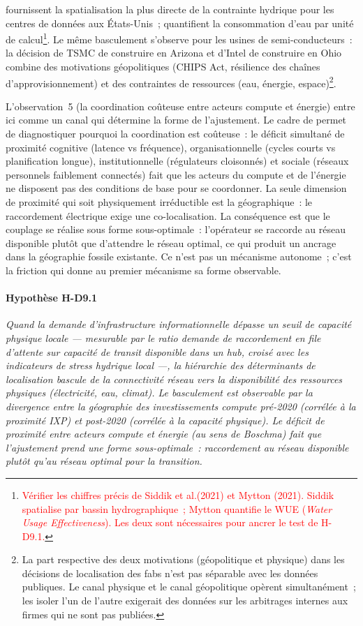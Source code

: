 \textcite{siddik_environmental_2021} fournissent la spatialisation la plus directe de la contrainte hydrique pour les centres de données aux États-Unis~; \textcite{mytton_data_2021} quantifient la consommation d'eau par unité de calcul\footnote{\textcolor{red}{Vérifier les chiffres précis de Siddik et al.\@ (2021) et Mytton (2021). Siddik spatialise par bassin hydrographique~; Mytton quantifie le WUE (\emph{Water Usage Effectiveness}). Les deux sont nécessaires pour ancrer le test de H-D9.1.}}. Le même basculement s'observe pour les usines de semi-conducteurs~: la décision de TSMC de construire en Arizona et d'Intel de construire en Ohio combine des motivations géopolitiques (CHIPS Act, résilience des chaînes d'approvisionnement) et des contraintes de ressources (eau, énergie, espace)\footnote{La part respective des deux motivations (géopolitique et physique) dans les décisions de localisation des fabs n'est pas séparable avec les données publiques. Le canal physique et le canal géopolitique opèrent simultanément~; les isoler l'un de l'autre exigerait des données sur les arbitrages internes aux firmes qui ne sont pas publiées.}.

L'observation~5 (la coordination coûteuse entre acteurs compute et énergie) entre ici comme un canal qui détermine la forme de l'ajustement. Le cadre de \textcite{boschma_proximity_2005} permet de diagnostiquer pourquoi la coordination est coûteuse~: le déficit simultané de proximité cognitive (latence vs fréquence), organisationnelle (cycles courts vs planification longue), institutionnelle (régulateurs cloisonnés) et sociale (réseaux personnels faiblement connectés) fait que les acteurs du compute et de l'énergie ne disposent pas des conditions de base pour se coordonner. La seule dimension de proximité qui soit physiquement irréductible est la géographique~: le raccordement électrique exige une co-localisation. La conséquence est que le couplage se réalise sous forme sous-optimale~: l'opérateur se raccorde au réseau disponible plutôt que d'attendre le réseau optimal, ce qui produit un ancrage dans la géographie fossile existante. Ce n'est pas un mécanisme autonome~; c'est la friction qui donne au premier mécanisme sa forme observable.

\paragraph{Hypothèse H-D9.1} \emph{Quand la demande d'infrastructure informationnelle dépasse un seuil de capacité physique locale --- mesurable par le ratio demande de raccordement en file d'attente sur capacité de transit disponible dans un hub, croisé avec les indicateurs de stress hydrique local ---, la hiérarchie des déterminants de localisation bascule de la connectivité réseau vers la disponibilité des ressources physiques (électricité, eau, climat). Le basculement est observable par la divergence entre la géographie des investissements compute pré-2020 (corrélée à la proximité IXP) et post-2020 (corrélée à la capacité physique). Le déficit de proximité entre acteurs compute et énergie (au sens de Boschma) fait que l'ajustement prend une forme sous-optimale~: raccordement au réseau disponible plutôt qu'au réseau optimal pour la transition.}


